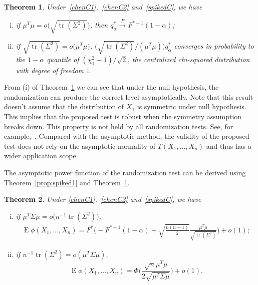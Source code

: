 \documentclass[3p]{elsarticle}
\DeclareMathOperator{\mytr}{tr}
\DeclareMathOperator{\myE}{E}
\theoremstyle{plain}
\newtheorem{theorem}{\quad\quad Theorem}
\theoremstyle{definition}
\theoremstyle{remark}
\begin{document}
\begin{theorem}\label{ourTheorem}
    Under~\eqref{chenC1},~\eqref{chenC2} and~\eqref{spikedC},
    we have
    \begin{enumerate}[(i)]
        \item
            if $\mu^T \mu=o\big(\sqrt{\mytr(\Sigma^2)}\big)$, then
            $
            q_{\alpha}^*\xrightarrow{P}F^{*-1}(1-\alpha)
            $;
\item
    if $\sqrt{\mytr(\Sigma^2)}=o\big(\mu^T \mu\big)$, $\big(\sqrt{\mytr(\Sigma^2)}/(\mu^T \mu)\big)q_{\alpha}^*$ converges in probability to the $1-\alpha$ quantile of  $(\chi^2_1-1)/\sqrt{2}$, the centralized chi-squared distribution with degree of freedom $1$.
    \end{enumerate}
\end{theorem}
From (i) of Theorem~\ref{ourTheorem} we can see that under the null hypothesis, the randomization can produce the correct level asymptotically.
Note that this result doesn't assume that the distribution of $X_1$ is symmetric under null hypothesis.
This implies that the proposed test is robust when the symmetry assumption breaks down.
This property is not held by all randomization tests.
See, for example,~\cite{Romano1990On}.
Compared with the asymptotic method, the validity of the proposed test does not rely on the asymptotic normality of $T(X_1,\ldots,X_n)$ and thus has a wider application scope.



The asymptotic power function of the randomization test can be derived using Theorem~\ref{prop:spiked1} and Theorem~\ref{ourTheorem}.

\begin{theorem}\label{theoremPower}
    Under \eqref{chenC1},~\eqref{chenC2} and~\eqref{spikedC}, we have
    \begin{enumerate}[(i)]
        \item
            if $\mu^T \Sigma \mu= o\big(n^{-1}\mytr(\Sigma^2)\big)$,
    \begin{equation*}\label{oPower}
        \begin{aligned}
            \myE \phi(X_1,\ldots,X_n)=
            F^*\bigg(-F^{*-1}(1-\alpha)+\sqrt{\frac{n(n-1)}{2}}\frac{\mu^T\mu}{\sqrt{\mytr (\Sigma^2)}}\bigg)+o(1);
        \end{aligned}
    \end{equation*}
\item
    if $n^{-1}\mytr(\Sigma^2)=o(\mu^T \Sigma \mu )$,
    \begin{equation*}\label{oPower2}
            \myE \phi(X_1,\ldots,X_n)=
            \Phi\Big(\frac{\sqrt{n}\mu^T\mu}{2\sqrt{\mu^T \Sigma \mu}}\Big)+o(1).
    \end{equation*}

    \end{enumerate}
\end{theorem}
\end{document}
